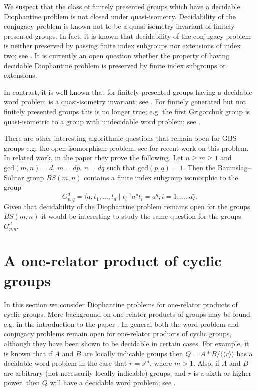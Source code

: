 \documentclass[11pt]{amsart}
\theoremstyle{definition}
\numberwithin{theorem}{section}
\begin{document}
We suspect that the class of finitely presented groups which have a decidable Diophantine problem is not closed under quasi-isometry. 
Decidability of the conjugacy problem is known not to be a quasi-isometry invariant of finitely presented groups. In fact, it is known that decidability of the conjugacy problem is neither preserved by passing finite index subgroups nor extensions of index two; see \cite{MillerBook}. It is currently an open question whether the property of having decidable Diophantine problem is preserved by finite index subgroups or extensions.   

In contrast, it is well-known that for finitely presented groups having a decidable word problem is a quasi-isometry invariant; see \cite{delaHarpeBook}. For finitely generated but not finitely presented groups this is no longer true; e.g. the first Grigorchuk group is quasi-isometric to a group with undecidable word problem; see \cite{mathoverflow}. 

There are other interesting algorithmic questions that remain open for GBS groups e.g. the open isomorphism problem; see  \cite{AscariCasalsRuizKazachkov} for recent work on this problem. 
In related work, in the paper \cite[Lemma 3.2]{CasalsRuizetal21} they prove the following. Let $n \geq m \geq 1$ and $\mathrm{gcd}(m,n)=d$, $m=dp$, $n = dq$ such that $\mathrm{gcd}(p,q)=1$. Then the Baumslag--Solitar group $BS(m,n)$ contains a finite index subgroup isomorphic to the group
\[G_{p,q}^d = \langle a, t_1, \ldots, t_d \mid t_i^{-1} a^p t_i = a^q, i = 1, \ldots, d \rangle. \]
Given that decidability of the Diophantine problem remains open for the groups $BS(m,n)$ it would be interesting to study the same question for the groups $G_{p,q}^d$.   

\section{A one-relator product of cyclic groups}
In this section we consider Diophantine problems for one-relator products of cyclic groups. More background on one-relator products of groups may be found e.g. in the introduction to the paper \cite{DuncanArye}. In general both the word problem and conjugacy problems remain open for one-relator products of cyclic groups, although they have been shown to be decidable in certain cases. For example, it is known that if $A$ and $B$ are locally indicable groups then $Q = A \ast B/ \langle \langle r \rangle \rangle$ has a decidable word problem in the case that $r = s^m$, where $m > 1$. Also, if $A$ and $B$ are arbitrary (not necessarily locally indicable) groups, and $r$ is a sixth or higher power, then $Q$ will have a decidable word problem; see 
\cite{Brodskii84, Howie81, HowieFourthPowers, ShortThesis}.
\end{document}

